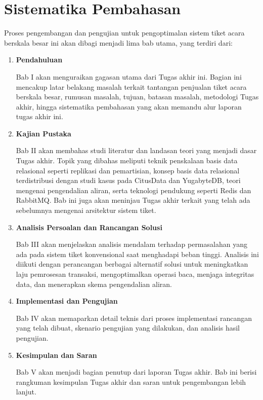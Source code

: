 \section{Sistematika Pembahasan}

Proses pengembangan dan pengujian untuk pengoptimalan sistem tiket acara berskala besar ini akan dibagi menjadi lima bab utama, yang terdiri dari:

\begin{enumerate}
    \item \textbf{Pendahuluan}

          Bab I akan menguraikan gagasan utama dari Tugas akhir ini. Bagian ini mencakup latar belakang masalah terkait tantangan penjualan tiket acara berskala besar, rumusan masalah, tujuan, batasan masalah, metodologi Tugas akhir, hingga sistematika pembahasan yang akan memandu alur laporan tugas akhir ini.

    \item \textbf{Kajian Pustaka}

          Bab II akan membahas studi literatur dan landasan teori yang menjadi dasar Tugas akhir. Topik yang dibahas meliputi teknik penskalaan basis data relasional seperti replikasi dan pemartisian, konsep basis data relasional terdistribusi dengan studi kasus pada CitusData dan YugabyteDB, teori mengenai pengendalian aliran, serta teknologi pendukung seperti Redis dan RabbitMQ. Bab ini juga akan meninjau Tugas akhir terkait yang telah ada sebelumnya mengenai arsitektur sistem tiket.

    \item \textbf{Analisis Persoalan dan Rancangan Solusi}

          Bab III akan menjelaskan analisis mendalam terhadap permasalahan yang ada pada sistem tiket konvensional saat menghadapi beban tinggi. Analisis ini diikuti dengan perancangan berbagai alternatif solusi untuk meningkatkan laju pemrosesan transaksi, mengoptimalkan operasi baca, menjaga integritas data, dan menerapkan skema pengendalian aliran.

    \item \textbf{Implementasi dan Pengujian}

          Bab IV akan memaparkan detail teknis dari proses implementasi rancangan yang telah dibuat, skenario pengujian yang dilakukan, dan analisis hasil pengujian.

    \item \textbf{Kesimpulan dan Saran}

          Bab V akan menjadi bagian penutup dari laporan Tugas akhir. Bab ini berisi rangkuman kesimpulan Tugas akhir dan saran untuk pengembangan lebih lanjut.

\end{enumerate}
